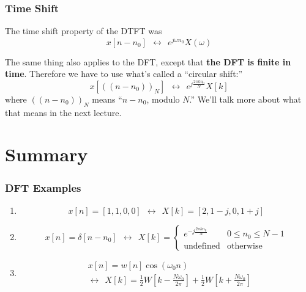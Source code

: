 \documentclass{beamer}
\begin{document}
\begin{frame}
  \frametitle{Time Shift}

  The time shift property of the DTFT was
  \begin{displaymath}
    x[n-n_0]~~\leftrightarrow~~e^{j\omega n_0}X(\omega)
  \end{displaymath}

  The same thing also applies to the DFT, except that {\bf the DFT is
    finite in time}.  Therefore we have to use what's called a ``circular shift:''
  \begin{displaymath}
    x\left[((n-n_0))_N\right]~~\leftrightarrow~~e^{j\frac{2\pi kn_0}{N}}X[k]
  \end{displaymath}
  where $((n-n_0))_N$ means ``$n-n_0$, modulo $N$.''  We'll talk more
  about what that means in the next lecture.
\end{frame}


\section[Summary]{Summary}
\setcounter{subsection}{1}


\begin{frame}
  \frametitle{DFT Examples}

  \begin{enumerate}
  \item
    \begin{displaymath}
      x[n]=[1,1,0,0]~~\leftrightarrow~~X[k]=[2,1-j,0,1+j]
    \end{displaymath}
  \item
    \begin{displaymath}
      x[n]=\delta[n-n_0]~~\leftrightarrow~~X[k]=\begin{cases}
      e^{-j\frac{2\pi kn_0}{N}} & 0\le n_0\le N-1\\
      \mbox{undefined} & \mbox{otherwise}
      \end{cases}
    \end{displaymath}
  \item 
    \begin{align*}
      &x[n]=w[n]\cos(\omega_0 n)\\
      &\leftrightarrow~~X[k]=
      \frac{1}{2}W\left[k-\frac{N\omega_0}{2\pi}\right]+
      \frac{1}{2}W\left[k+\frac{N\omega_0}{2\pi}\right]
    \end{align*}
  \end{enumerate}
\end{frame}
\end{document}
